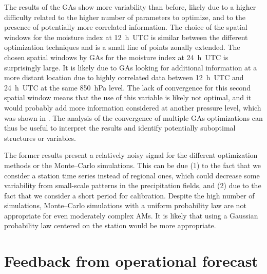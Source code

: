 \documentclass[review]{elsarticle}
\begin{document}
The results of the GAs show more variability than before, likely due to a higher difficulty related to the higher number of parameters to optimize, and to the presence of potentially more correlated information. The choice of the spatial windows for the moisture index at 12~h~UTC is similar between the different optimization techniques and is a small line of points zonally extended. The chosen spatial windows by GAs for the moisture index at 24~h~UTC is surprisingly large. It is likely due to GAs looking for additional information at a more distant location due to highly correlated data between 12~h~UTC and 24~h~UTC at the same 850~hPa level. The lack of convergence for this second spatial window means that the use of this variable is likely not optimal, and it would probably add more information considered at another pressure level, which was shown in \citet{Horton2018a}. The analysis of the convergence of multiple GAs optimizations can thus be useful to interpret the results and identify potentially suboptimal structures or variables.

The former results present a relatively noisy signal for the different optimization methods or the Monte--Carlo simulations. This can be due (1) to the fact that we consider a station time series instead of regional ones, which could decrease some variability from small-scale patterns in the precipitation fields, and (2) due to the fact that we consider a short period for calibration. Despite the high number of simulations, Monte--Carlo simulations with a uniform probability law are not appropriate for even moderately complex AMs. It is likely that using a Gaussian probability law centered on the station would be more appropriate.


\section{Feedback from operational forecast}
\label{sec:operational}
\end{document}
